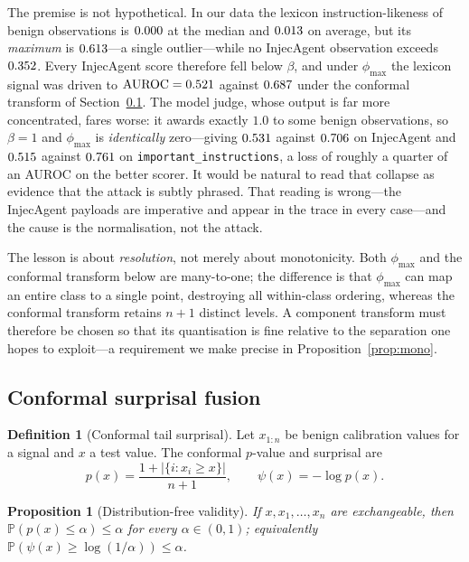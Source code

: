 \documentclass[preprint,12pt,authoryear]{elsarticle}
\newtheorem{proposition}[theorem]{Proposition}
\theoremstyle{definition}
\newtheorem{definition}{Definition}
\newcommand{\Prob}{\mathbb{P}}
\begin{document}
The premise is not hypothetical. In our data the lexicon instruction-likeness of
benign observations is $0.000$ at the median and $0.013$ on average,
but its \emph{maximum} is $0.613$---a single outlier---while no InjecAgent
observation exceeds $0.352$. Every InjecAgent score therefore fell below
$\beta$, and under $\phi_{\max}$ the lexicon signal was driven to
$\mathrm{AUROC} = 0.521$ against $0.687$ under the conformal
transform of Section~\ref{sec:fusion}. The model judge, whose output is far more
concentrated, fares worse: it awards exactly $1.0$ to some benign observations, so
$\beta = 1$ and $\phi_{\max}$ is \emph{identically} zero---giving
$0.531$ against $0.706$ on InjecAgent and
$0.515$ against $0.761$ on
\texttt{important\_instructions}, a loss of roughly a quarter of an AUROC on the
better scorer. It would be natural to read that collapse as evidence that the
attack is subtly phrased. That reading is wrong---the InjecAgent payloads are
imperative and appear in the trace in every case---and the cause is the
normalisation, not the attack.

The lesson is about \emph{resolution}, not merely about monotonicity. Both
$\phi_{\max}$ and the conformal transform below are many-to-one; the difference is
that $\phi_{\max}$ can map an entire class to a single point, destroying all
within-class ordering, whereas the conformal transform retains $n+1$ distinct
levels. A component transform must therefore be chosen so that its quantisation
is fine relative to the separation one hopes to exploit---a requirement we make
precise in Proposition~\ref{prop:mono}.

\subsection{Conformal surprisal fusion}\label{sec:fusion}

\begin{definition}[Conformal tail surprisal]
Let $x_{1:n}$ be benign calibration values for a signal and $x$ a test value. The
conformal $p$-value and surprisal are
\begin{equation}\label{eq:conformal}
p(x) = \frac{1 + |\{i : x_i \ge x\}|}{n+1},
\qquad
\psi(x) = -\log p(x).
\end{equation}
\end{definition}

\begin{proposition}[Distribution-free validity]\label{prop:valid}
If $x, x_1, \dots, x_n$ are exchangeable, then $\Prob(p(x) \le \alpha) \le \alpha$
for every $\alpha \in (0,1)$; equivalently
$\Prob(\psi(x) \ge \log(1/\alpha)) \le \alpha$.
\end{proposition}
\end{document}
